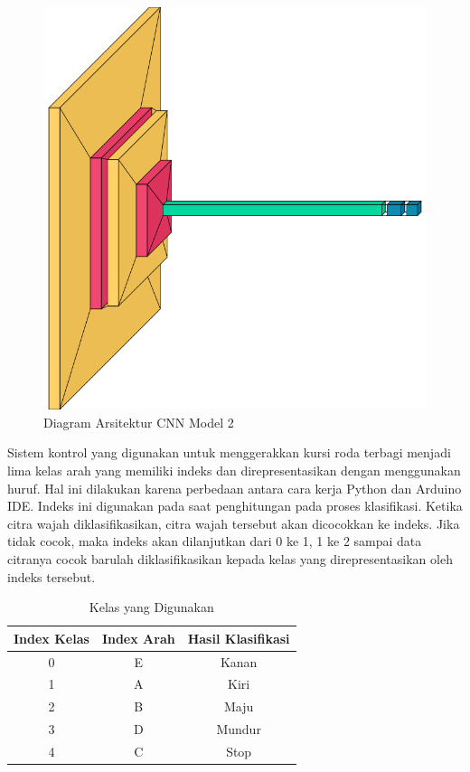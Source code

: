 \begin{figure}[H]
  \centering
  \includegraphics[scale=0.4]{gambar/arsitekturcnngambartdk.png}
  \caption{Diagram Arsitektur CNN Model 2}
  \label{fig:arsitekturcnngambar}
\end{figure}


Sistem kontrol yang digunakan untuk menggerakkan kursi roda terbagi menjadi lima kelas arah yang memiliki indeks dan direpresentasikan dengan menggunakan huruf. Hal ini dilakukan karena perbedaan antara cara kerja Python dan Arduino IDE. Indeks ini digunakan pada saat penghitungan pada proses klasifikasi. Ketika citra wajah diklasifikasikan, citra wajah tersebut akan dicocokkan ke indeks. Jika tidak cocok, maka indeks akan dilanjutkan dari 0 ke 1, 1 ke 2 sampai data citranya cocok barulah diklasifikasikan kepada kelas yang direpresentasikan oleh indeks tersebut.

\begin{table}[H]
\begin{longtable}{|c|c|c|}
  \caption{Kelas yang Digunakan}
  \label{tb:EnergiKecepatan}                                   \\
  \hline
  \rowcolor[HTML]{C0C0C0}
  \textbf{Index Kelas} & \textbf{Index Arah} & \textbf{Hasil Klasifikasi} \\
  \hline
  0   & E   & Kanan   \\
  1   & A   & Kiri   \\
  2   & B    & Maju   \\
  3   & D   & Mundur   \\
  4   & C    & Stop   \\
    \hline
\end{longtable}
\end{table}
